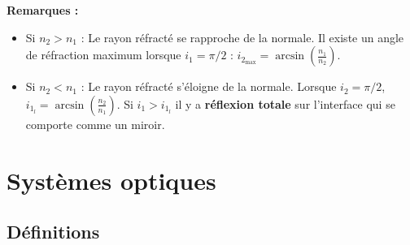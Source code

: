 \documentclass{cours}
\begin{document}
\textbf{Remarques :}
\begin{itemize}
\item Si $n_2>n_1$ : Le rayon réfracté se rapproche de la normale. Il existe un angle de réfraction maximum lorsque $i_1=\pi/2$ : $i_{2_{\text{max}}} = \arcsin \left(\frac{n_1}{n_2}\right)$.
\item Si $n_2<n_1$ : Le rayon réfracté s'éloigne de la normale. Lorsque $i_2=\pi/2$, $i_{1_l}=\arcsin(\frac{n_2}{n_1})$. Si $i_1>i_{1_l}$ il y a \textbf{réflexion totale} sur l'interface qui se comporte comme un miroir.
\end{itemize}

\section{Systèmes optiques}
\subsection{Définitions}
\end{document}
